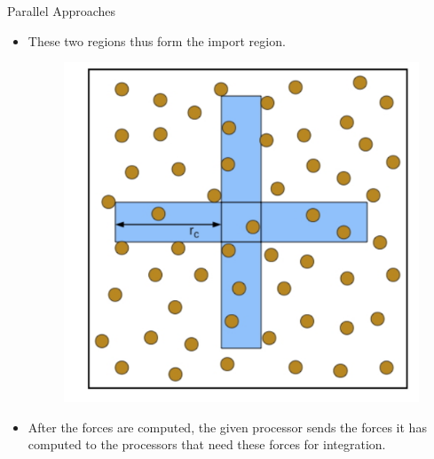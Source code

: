\documentclass[aspectratio=169]{beamer}
\begin{document}
\begin{frame}[fragile]{Parallel Approaches}


\begin{itemize}
\item These two regions thus form the import region.
\begin{figure}[H]
\includegraphics[scale=0.2]{Graphics/slide_9.png}
\end{figure}
\item After the forces are computed, the given processor sends the forces it has computed to the processors that need these forces for integration. 

\end{itemize}



\end{frame}
\end{document}
